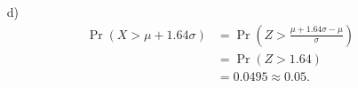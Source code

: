 \documentclass[12pt]{article}
\begin{document}
{\begin{minipage}[t]{0.98\textwidth}
\begin{minipage}[t]{0.47\textwidth}
\begin{enumerate}
\begin{align*}
&\vdots\\
\Rightarrow \Pr(Z > k) &= \frac{1 - 0.99}{2} = 0.005\\[0.4cm]
\Rightarrow k &= 2.58.
\end{align*}
\item[d)]\quad\\[-1.45cm]
\begin{align*}
\Pr(X > \mu + 1.64 \sigma)
&=\Pr(Z > \tfrac{\mu + 1.64 \sigma - \mu}{\sigma})\\
&=\Pr(Z > 1.64) \\
&= 0.0495 \approx 0.05.\\
\end{align*}
\end{enumerate}
\end{minipage}
\end{minipage}}\vspace{0.03\textwidth}
\end{document}
